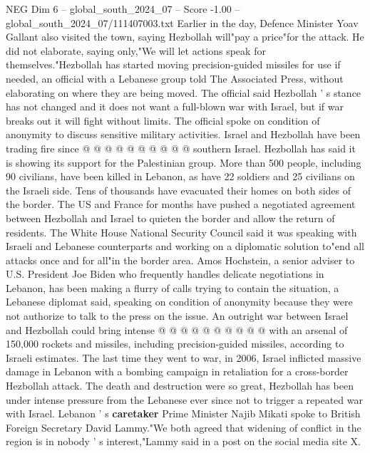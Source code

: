 \begin{textsample}{NEG Dim 6 – global\_south\_2024\_07 – Score -1.00 – global\_south\_2024\_07/111407003.txt}
Earlier in the day, Defence Minister Yoav Gallant also visited the town, saying Hezbollah will"pay a price"for the attack.
He did not elaborate, saying only,"We will let actions speak for themselves."Hezbollah has started moving precision-guided missiles for use if needed, an official with a Lebanese group told The Associated Press, without elaborating on where they are being moved.
The official said Hezbollah ' s stance has not changed and it does not want a full-blown war with Israel, but if war breaks out it will fight without limits.
The official spoke on condition of anonymity to discuss sensitive military activities.
Israel and Hezbollah have been trading fire since @ @ @ @ @ @ @ @ @ @ southern Israel.
Hezbollah has said it is showing its support for the Palestinian group.
More than 500 people, including 90 civilians, have been killed in Lebanon, as have 22 soldiers and 25 civilians on the Israeli side.
Tens of thousands have evacuated their homes on both sides of the border.
The US and France for months have pushed a negotiated agreement between Hezbollah and Israel to quieten the border and allow the return of residents.
The White House National Security Council said it was speaking with Israeli and Lebanese counterparts and working on a diplomatic solution to"end all attacks once and for all"in the border area.
Amos Hochstein, a senior adviser to U.S.
President Joe Biden who frequently handles delicate negotiations in Lebanon, has been making a flurry of calls trying to contain the situation, a Lebanese diplomat said, speaking on condition of anonymity because they were not authorize to talk to the press on the issue.
An outright war between Israel and Hezbollah could bring intense @ @ @ @ @ @ @ @ @ @ with an arsenal of 150,000 rockets and missiles, including precision-guided missiles, according to Israeli estimates.
The last time they went to war, in 2006, Israel inflicted massive damage in Lebanon with a bombing campaign in retaliation for a cross-border Hezbollah attack.
The death and destruction were so great, Hezbollah has been under intense pressure from the Lebanese ever since not to trigger a repeated war with Israel.
Lebanon ' s \textbf{caretaker} Prime Minister Najib Mikati spoke to British Foreign Secretary David Lammy."We both agreed that widening of conflict in the region is in nobody ' s interest,"Lammy said in a post on the social media site X.

\end{textsample}
